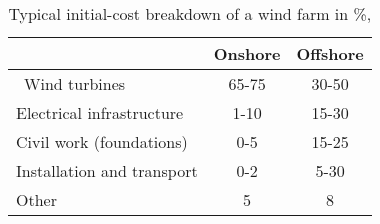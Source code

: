 \begin{table}
\label{tab:typicalcost}

\begin{tabular}{lcc}
\hline 
 & Onshore & Offshore \\ 
\hline \
Wind turbines & 65-75 & 30-50 \\ 
Electrical infrastructure & 1-10 & 15-30 \\ 
Civil work (foundations) & 0-5 & 15-25 \\ 
Installation and transport & 0-2 & 5-30 \\ 
Other & 5 & 8 \\ 
\hline 
\end{tabular}
\caption{Typical initial-cost breakdown of a wind farm in \%, \cite{Henderson2003, Junginger2004, UK10, TCE12, IRENA12}}
\end{table}



